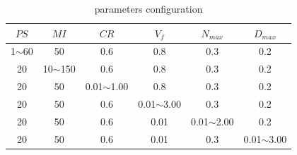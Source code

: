 \documentclass[10pt,journal,compsoc]{IEEEtran}
\begin{document}
\begin{table}[!t]
\renewcommand{\arraystretch}{1.3}
\caption{parameters configuration}
\label{table_example}
\centering
\begin{tabular}{cccccc}
\hline
\bfseries $PS$ & \bfseries $MI$ & \bfseries $CR$ & \bfseries $V_f$ & \bfseries $N_{max}$ & \bfseries $D_{max}$ \\
\hline
1$\sim$60 & 50          & 0.6            & 0.8            &  0.3            &  0.2 \\
20        & 10$\sim$150 & 0.6            & 0.8            &  0.3            &  0.2 \\
20        & 50          & 0.01$\sim$1.00 & 0.8            &  0.3            &  0.2 \\
20        & 50          & 0.6            & 0.01$\sim$3.00 &  0.3            &  0.2 \\
20        & 50          & 0.6            & 0.01           &  0.01$\sim$2.00 &  0.2 \\
20        & 50          & 0.6            & 0.01           &  0.3            &  0.01$\sim$3.00 \\
\hline
\end{tabular}
\end{table}
\end{document}
